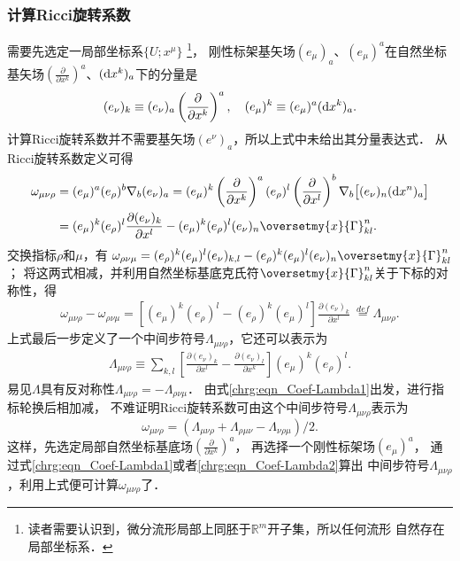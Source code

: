 \subsubsection{计算Ricci旋转系数}
     需要先选定一局部坐标系$\{U;x^\mu\}$
    {\footnote{读者需要认识到，微分流形局部上同胚于$\mathbb{R}^m$开子集，所以任何流形
            自然存在局部坐标系．}}，
刚性标架基矢场$(e_\mu)_{a}$、$(e_\mu)^{a}$在自然坐标
基矢场$(\frac{\partial}{\partial x^k})^{a}$、$({\rm d}x^k)_{a}$下的分量是
\begin{equation}\label{chrg:eqn_component-base}
(e_\nu)_{k} \equiv (e_\nu)_{a} \left(\frac{\partial}{\partial x^k}\right)^{a} , \quad
(e_\mu)^{k} \equiv (e_\mu)^{a} ({\rm d}x^k)_{a}.
\end{equation}
计算Ricci旋转系数并不需要基矢场$(e^\nu)_{a}$，所以上式中未给出其分量表达式．
从Ricci旋转系数定义可得
\begin{align*}
  \omega_{\mu\nu\rho} &= (e_\mu)^a  (e_\rho)^b \nabla _b (e_\nu)_a
  = (e_\mu)^{k} \left(\frac{\partial}{\partial x^k}\right)^{a}
   (e_\rho)^{l} \left(\frac{\partial}{\partial x^l}\right)^{b}
    \nabla _b \bigl[ (e_\nu)_{n}({\rm d}x^n)_{a} \bigr]  \\
  &=(e_\mu)^{k}(e_\rho)^{l} \frac{\partial (e_\nu)_{k}}{\partial x^l}
   -(e_\mu)^{k}(e_\rho)^{l} (e_\nu)_{n} \oversetmy{x}{\Gamma}^n _{kl} .
\end{align*}
交换指标$\rho$和$\mu$，有
$ \omega_{\rho\nu\mu} =(e_\rho)^{k}(e_\mu)^{l} (e_\nu)_{k,l}
-(e_\rho)^{k}(e_\mu)^{l} (e_\nu)_{n} \oversetmy{x}{\Gamma}^n _{kl}$；
将这两式相减，并利用自然坐标基底克氏符$\oversetmy{x}{\Gamma}^n _{kl}$关于下标的对称性，得
\begin{align}
  \omega_{\mu\nu\rho}  -  \omega_{\rho\nu\mu}=
  \left[ (e_\mu)^{k}(e_\rho)^{l}
     - (e_\rho)^{k}(e_\mu)^{l}  \right]
     \frac{\partial (e_\nu)_{k}}{\partial x^l}
  \ \overset{def}{=} \Lambda_{\mu\nu\rho}. \label{chrg:eqn_Coef-Lambda1}
\end{align}
上式最后一步定义了一个中间步符号$\Lambda_{\mu\nu\rho}$，它还可以表示为
\begin{align}
    \Lambda_{\mu\nu\rho} \equiv \sum_{k,l }
    \left[ \frac{\partial (e_\nu)_{k}}{\partial x^l} -\frac{\partial (e_\nu)_{l}}{\partial x^k} \right]
    (e_\mu)^{k} (e_\rho)^{l} .  \label{chrg:eqn_Coef-Lambda2}
\end{align}
易见$\Lambda$具有反对称性$\Lambda_{\mu\nu\rho}=-\Lambda_{\rho\nu\mu}$．
由式\eqref{chrg:eqn_Coef-Lambda1}出发，进行指标轮换后相加减，
不难证明Ricci旋转系数可由这个中间步符号$\Lambda_{\mu\nu\rho}$表示为
\begin{equation}\label{chrg:eqn_Ricci-Coef}
\omega_{\mu\nu\rho} = \left(\Lambda_{\mu\nu\rho}
+ \Lambda_{\rho\mu\nu} - \Lambda_{\nu\rho\mu} \right) /2.
\end{equation}
这样，先选定局部自然坐标基底场$(\frac{\partial}{\partial x^k})^{a}$，
再选择一个刚性标架场$(e_\mu)^a$，
通过式\eqref{chrg:eqn_Coef-Lambda1}或者\eqref{chrg:eqn_Coef-Lambda2}算出
中间步符号$\Lambda_{\mu\nu\rho}$，利用上式便可计算$\omega_{\mu\nu\rho}$了．

